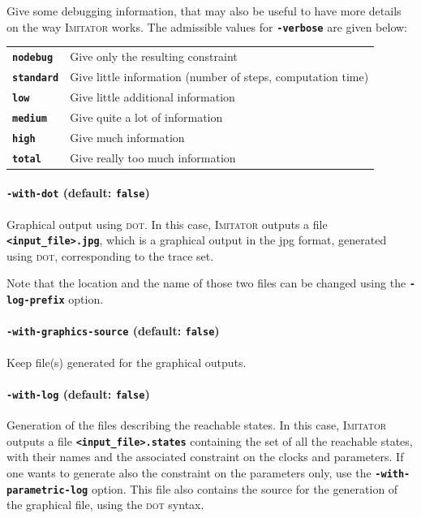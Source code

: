 \documentclass[a4paper,11pt]{article}
\newcommand{\gdot}{\textsc{dot}}
\newcommand{\imitator}{\textsc{Imitator}}
\newcommand{\code}[1]{\textbf{\texttt{#1}}}
\begin{document}
Give some debugging information, that may also be useful to have more details on the way \imitator{} works.
The admissible values for \code{-verbose} are given below:

\begin{tabular}{@{} l @{\ \ } l}
 \code{nodebug} & Give only the resulting constraint \\
 \code{standard} & Give little information (number of steps, computation time)\\
 \code{low} & Give little additional information\\
 \code{medium} & Give quite a lot of information\\
 \code{high} & Give much information\\
 \code{total} & Give really too much information\\
\end{tabular}



\paragraph{\code{-with-dot} (default: \code{false})}
Graphical output using \gdot{}.
In this case, \imitator{} outputs a file \code{<input\_file>.jpg}, which is a graphical output in the jpg format, generated using \gdot{}, corresponding to the trace set.

Note that the location and the name of those two files can be changed using the \code{-log-prefix} option.


\paragraph{\code{-with-graphics-source} (default: \code{false})}
Keep file(s) generated for the graphical outputs.


\paragraph{\code{-with-log} (default: \code{false})}
Generation of the files describing the reachable states.
In this case, \imitator{} outputs a file \code{<input\_file>.states} containing the set of all the reachable states, with their names and the associated constraint on the clocks and parameters.
If one wants to generate also the constraint on the parameters only, use the \code{-with-parametric-log} option.
This file also contains the source for the generation of the graphical file, using the \gdot{} syntax.
\end{document}
